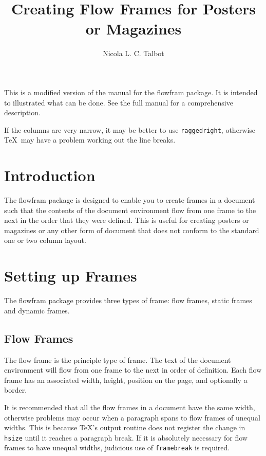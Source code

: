 \documentclass[a4paper]{article}
\newcommand{\sty}[1]{\textsf{#1}}
\newcommand{\env}[1]{\textsf{#1}}
\newcommand{\cmdname}[1]{\texttt{\symbol{92}#1}}
\begin{document}
\begin{staticcontents}{1}
\title{Creating Flow Frames for Posters or Magazines}
\author{Nicola L. C. Talbot}
\date{}
\maketitle
\end{staticcontents}

This is a modified version of the manual for the \sty{flowfram} package.
It is intended to illustrated what can be done. See the full manual for
a comprehensive description.

If the columns are very narrow, it may be better to
use \cmdname{raggedright}, otherwise \TeX\ may have a
problem working out the line breaks.

\section{Introduction}

The \sty{flowfram} package is designed to enable you to create
frames in a document such that the
contents of the \env{document} environment flow from one
frame to the next in the order that they were defined.
This is useful for creating posters
or magazines or any other form of document that does not
conform to the standard one or two column layout.

\section{Setting up Frames}

The \sty{flowfram} package provides three types of frame:
{flow frames}, {static
frames} and {dynamic frames}.

\subsection{Flow Frames}

The flow frame is the principle type of frame.
The text of the \env{document} environment will flow from
one frame to the next in order of definition. Each
flow frame has an associated width, height,
position on the page, and optionally a border.

It is recommended that all the flow frames in a document
have the same width, otherwise problems may occur
when a paragraph spans to flow frames of unequal
widths. This is because \TeX's output routine does not
register the change in \cmdname{hsize} until it reaches
a paragraph break. If it is absolutely necessary for
flow frames to have unequal widths, judicious use of
\cmdname{framebreak} is required.
\end{document}
